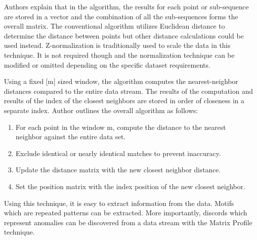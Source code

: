 Authors \cite{yeh2016matrix-profile-1} explain that in the algorithm, the results for each point or sub-sequence are stored in a vector and the combination of all the sub-sequences forms the overall matrix. The conventional algorithm utilizes Euclidean distance to determine the distance between points but other distance calculations could be used instead. Z-normalization is traditionally used to scale the data in this technique. It is not required though and the normalization technique can be modified or omitted depending on the specific dataset requirements.

Using a fixed [m] sized window, the algorithm computes the nearest-neighbor distances compared to the entire data stream. The results of the computation and results of the index of the closest neighbors are stored in order of closeness in a separate index. Author \cite{matrix-profile-intro} outlines the overall algorithm as follows:
\begin{enumerate}
    \item For each point in the window m, compute the distance to the nearest neighbor against the entire data set.
    \item Exclude identical or nearly identical matches to prevent inaccuracy.
    \item Update the distance matrix with the new closest neighbor distance.
    \item Set the position matrix with the index position of the new closest neighbor.
\end{enumerate}

Using this technique, it is easy to extract information from the data. Motifs which are repeated patterns can be extracted. More importantly, discords which represent anomalies can be discovered from a data stream with the Matrix Profile technique.




